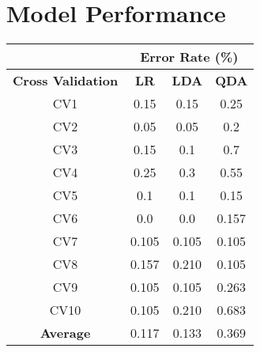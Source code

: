 \section{Model Performance}

\begin{center}
    \begin{tabular}{|c|c|c|c|}
        \hline
            \multicolumn{1}{|r|}{} & \multicolumn{3}{|c|}{Error Rate (\%)} \\
        \hline
        \textbf{Cross Validation} & \textbf{LR} & \textbf{LDA} & \textbf{QDA} \\
        \hline
        CV1 & 0.15 & 0.15 & 0.25 \\
        \hline
        CV2 & 0.05 & 0.05 & 0.2 \\
        \hline
        CV3 & 0.15 & 0.1 & 0.7 \\
        \hline 
        CV4 & 0.25 & 0.3 & 0.55 \\
        \hline 
        CV5 & 0.1 & 0.1 & 0.15 \\
        \hline
        CV6 & 0.0 & 0.0 & 0.157 \\
        \hline 
        CV7 & 0.105 & 0.105 & 0.105 \\
        \hline 
        CV8 & 0.157 & 0.210 & 0.105 \\
        \hline
        CV9 & 0.105 & 0.105 & 0.263 \\
        \hline
        CV10 & 0.105 & 0.210 & 0.683 \\
        \hline
        \textbf{Average} & 0.117 & 0.133 & 0.369 \\
        \hline
    \end{tabular}
\end{center}


